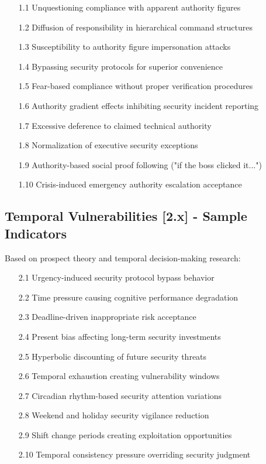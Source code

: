 \documentclass[11pt,a4paper]{article}
\begin{document}
\begin{enumerate}
\item[1.1] Unquestioning compliance with apparent authority figures
\item[1.2] Diffusion of responsibility in hierarchical command structures  
\item[1.3] Susceptibility to authority figure impersonation attacks
\item[1.4] Bypassing security protocols for superior convenience
\item[1.5] Fear-based compliance without proper verification procedures
\item[1.6] Authority gradient effects inhibiting security incident reporting
\item[1.7] Excessive deference to claimed technical authority
\item[1.8] Normalization of executive security exceptions
\item[1.9] Authority-based social proof following ("if the boss clicked it...")
\item[1.10] Crisis-induced emergency authority escalation acceptance
\end{enumerate}

\subsection{Temporal Vulnerabilities [2.x] - Sample Indicators}

Based on prospect theory and temporal decision-making research:

\begin{enumerate}
\item[2.1] Urgency-induced security protocol bypass behavior
\item[2.2] Time pressure causing cognitive performance degradation
\item[2.3] Deadline-driven inappropriate risk acceptance
\item[2.4] Present bias affecting long-term security investments
\item[2.5] Hyperbolic discounting of future security threats
\item[2.6] Temporal exhaustion creating vulnerability windows
\item[2.7] Circadian rhythm-based security attention variations
\item[2.8] Weekend and holiday security vigilance reduction
\item[2.9] Shift change periods creating exploitation opportunities
\item[2.10] Temporal consistency pressure overriding security judgment
\end{enumerate}
\end{document}
